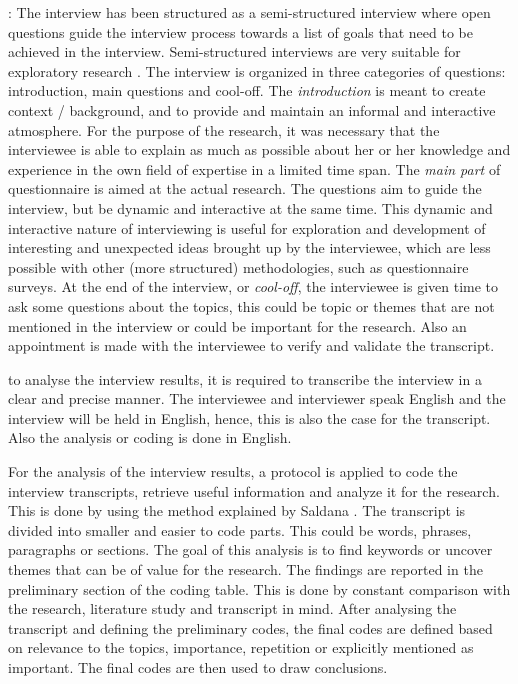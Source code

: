 : The interview has been structured as a semi-structured interview where open questions guide the interview process towards a list of goals that need to be achieved in the interview. Semi-structured interviews are very suitable for exploratory research \cite{Runeson:2009:GCR:1519313.1519324}. The interview is organized in three categories of questions: introduction, main questions and cool-off.
The {\em introduction} is meant to create context / background, and to provide and maintain an informal and interactive atmosphere. For the purpose of the research, it was necessary that the interviewee is able to explain as much as possible about her or her knowledge and experience in the own field of expertise in a limited time span. 
The {\em main part} of questionnaire is aimed at the actual research. The questions aim to guide the interview, but be dynamic and interactive at the same time. This dynamic and interactive nature of interviewing is useful for exploration and development of interesting and unexpected ideas brought up by the interviewee, which are less possible with other (more structured) methodologies, such as questionnaire surveys.
At the end of the interview, or {\em cool-off}, the interviewee is given time to ask some questions about the topics, this could be topic or themes that are not mentioned in the interview or could be important for the research. Also an appointment is made with the interviewee to verify and validate the transcript.

 to analyse the interview results, it is required to transcribe the interview in a clear and precise manner. The interviewee and interviewer speak English and the interview will be held in English, hence, this is also the case for the transcript. Also the analysis or coding is done in English.

 For the analysis of the interview results, a protocol is applied to code the interview transcripts, retrieve useful information and analyze it for the research. This is done by using the method explained by Saldana \cite{saldana2015coding}. The transcript is divided into smaller and easier to code parts. This could be words, phrases, paragraphs or sections. The goal of this analysis is to find keywords or uncover themes that can be of value for the research. The findings are reported in the preliminary section of the coding table. This is done by constant comparison with the research, literature study and transcript in mind. After analysing the transcript and defining the preliminary codes, the final codes are defined based on relevance to the topics, importance, repetition or explicitly mentioned as important. The final codes are then used to draw conclusions.

